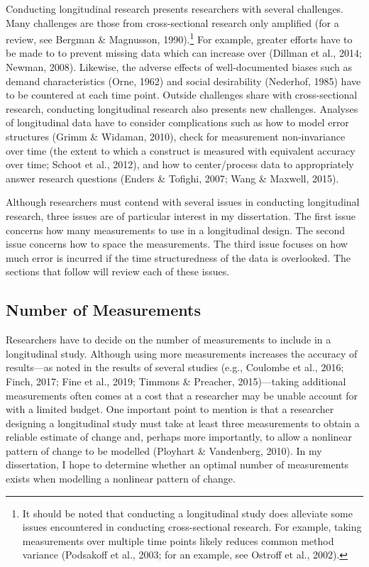 \documentclass[
12pt, %
twoside,
english]{guelphthesis}
\theoremstyle{definition}
\theoremstyle{definition}
\theoremstyle{definition}
\theoremstyle{definition}
\theoremstyle{remark}
\begin{document}
Conducting longitudinal research presents researchers with several challenges. Many challenges are those from cross-sectional research only amplified (for a review, see Bergman \& Magnusson, 1990).\footnote{It should be noted that conducting a longitudinal study does alleviate some issues encountered in conducting cross-sectional research. For example, taking measurements over multiple time points likely reduces common method variance (Podsakoff et al., 2003; for an example, see Ostroff et al., 2002).} For example, greater efforts have to be made to to prevent missing data which can increase over (Dillman et al., 2014; Newman, 2008). Likewise, the adverse effects of well-documented biases such as demand characteristics (Orne, 1962) and social desirability (Nederhof, 1985) have to be countered at each time point. Outside challenges share with cross-sectional research, conducting longitudinal research also presents new challenges. Analyses of longitudinal data have to consider complications such as how to model error structures (Grimm \& Widaman, 2010), check for measurement non-invariance over time (the extent to which a construct is measured with equivalent accuracy over time; Schoot et al., 2012), and how to center/process data to appropriately answer research questions (Enders \& Tofighi, 2007; Wang \& Maxwell, 2015).

Although researchers must contend with several issues in conducting longitudinal research, three issues are of particular interest in my dissertation. The first issue concerns how many measurements to use in a longitudinal design. The second issue concerns how to space the measurements. The third issue focuses on how much error is incurred if the time structuredness of the data is overlooked. The sections that follow will review each of these issues.

\hypertarget{number-of-measurements}{%
\subsection{Number of Measurements}\label{number-of-measurements}}

Researchers have to decide on the number of measurements to include in a longitudinal study. Although using more measurements increases the accuracy of results---as noted in the results of several studies (e.g., Coulombe et al., 2016; Finch, 2017; Fine et al., 2019; Timmons \& Preacher, 2015)---taking additional measurements often comes at a cost that a researcher may be unable account for with a limited budget. One important point to mention is that a researcher designing a longitudinal study must take at least three measurements to obtain a reliable estimate of change and, perhaps more importantly, to allow a nonlinear pattern of change to be modelled (Ployhart \& Vandenberg, 2010). In my dissertation, I hope to determine whether an optimal number of measurements exists when modelling a nonlinear pattern of change.
\end{document}
